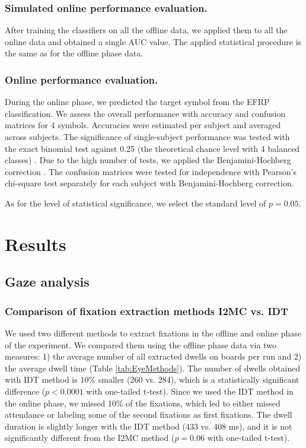 \documentclass[12pt]{iopart}
\begin{document}
\subsubsection*{Simulated online performance evaluation.}
After training the classifiers on all the offline data, we applied them 
to all the online data and obtained a single AUC value.
The applied statistical procedure is the same as for the offline phase data.

\subsubsection*{Online performance evaluation.}
During the online phase, we predicted the target symbol from the EFRP classification.
We assess the overall performance with accuracy and confusion matrices
for 4 symbols. Accuracies were estimated per subject and averaged across subjects.
The significance of single-subject performance was tested with the exact binomial test against
0.25 (the theoretical chance level with 4 balanced classes) \cite{muller-putz_better_2008}.
Due to the high number of tests,
we applied the Benjamini-Hochberg correction \cite{benjamini_controlling_1995}.
The confusion matrices were tested for independence
with Pearson's chi-square test \cite{frs_x_1900} separately for each subject 
with Benjamini-Hochberg correction.

As for the level of statistical significance, we select the standard level of $p = 0.05$.

\section{Results}
\label{sec:results}
\subsection{Gaze analysis}

\subsubsection*{Comparison of fixation extraction methods I2MC vs. IDT}
We used two different methods to extract fixations in the offline 
and online phase of the experiment. We compared them using
the offline phase data via two measures: 1) the average number of all extracted
dwells on boards per run and 2) the average dwell time (Table \ref{tab:EyeMethods}).
The number of dwells obtained with IDT method is 10\% smaller (260 vs. 284),
which is a statistically significant difference
($p < 0.0001$ with one-tailed t-test).
Since we used the IDT method in the online phase,
we missed 10\% of the fixations, which led
to either missed attendance or labeling some of the second
fixations as first fixations.
The dwell duration is slightly longer with the IDT method (433 vs. 408 ms),
and it is not significantly different from the I2MC method
($p = 0.06$ with one-tailed t-test).
\end{document}
